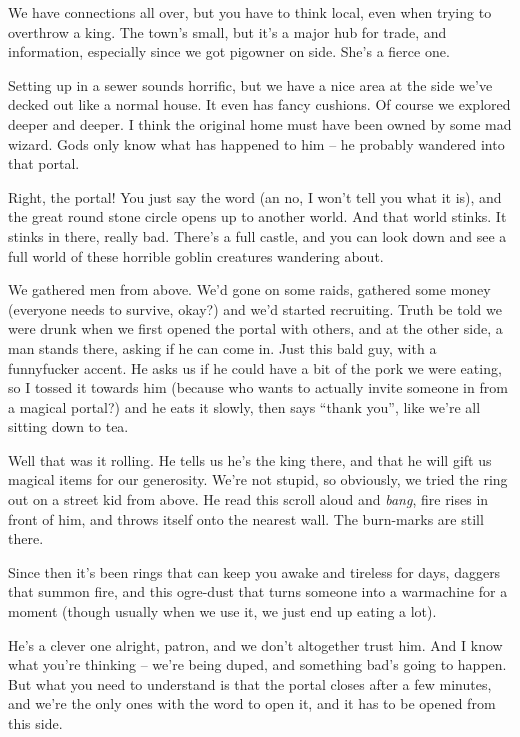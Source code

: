 \begin{speechtext}
	We have connections all over, but you have to think local, even when trying to overthrow a king.  The town's small, but it's a major hub for trade, and information, especially since we got \gls{pigowner} on side.  She's a fierce one.

	Setting up in a sewer sounds horrific, but we have a nice area at the side we've decked out like a normal house.  It even has fancy cushions.  Of course we explored deeper and deeper.  I think the original home must have been owned by some mad wizard.  Gods only know what has happened to him -- he probably wandered into that portal.

	Right, the portal!  You just say the word (an no, I won't tell you what it is), and the great round stone circle opens up to another world.  And that world stinks.  It stinks in there, really bad.  There's a full castle, and you can look down and see a full world of these horrible goblin creatures wandering about.

	We gathered men from above.  We'd gone on some raids, gathered some money (everyone needs to survive, okay?) and we'd started recruiting.  Truth be told we were drunk when we first opened the portal with others, and at the other side, a man stands there, asking if he can come in.  Just this bald guy, with a funnyfucker accent.  He asks us if he could have a bit of the pork we were eating, so I tossed it towards him (because who wants to actually invite someone in from a magical portal?) and he eats it slowly, then says ``thank you'', like we're all sitting down to tea.

	Well that was it rolling.  He tells us he's the king there, and that he will gift us magical items for our generosity.  We're not stupid, so obviously, we tried the ring out on a street kid from above.  He read this scroll aloud and \emph{bang}, fire rises in front of him, and throws itself onto the nearest wall.  The burn-marks are still there.

	Since then it's been rings that can keep you awake and tireless for days, daggers that summon fire, and this ogre-dust that turns someone into a warmachine for a moment (though usually when we use it, we just end up eating a lot).

	He's a clever one alright, \gls{patron}, and we don't altogether trust him.  And I know what you're thinking -- we're being duped, and something bad's going to happen.  But what you need to understand is that the portal closes after a few minutes, and we're the only ones with the word to open it, and it has to be opened from this side.

\end{speechtext}

